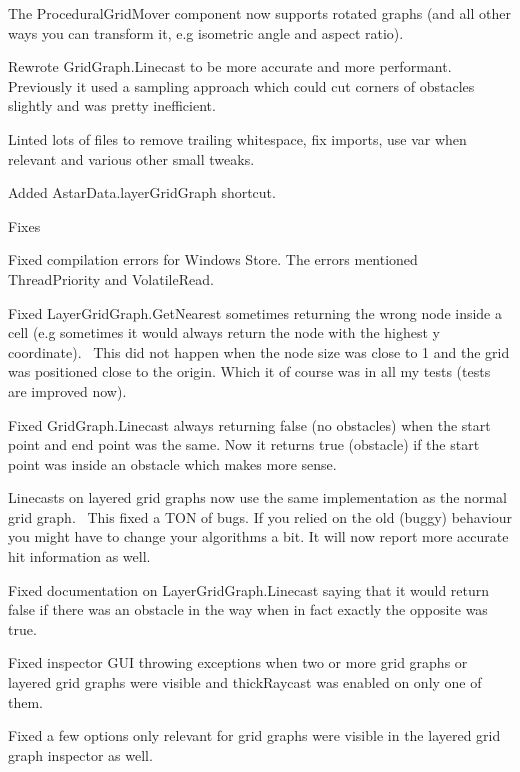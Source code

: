 \begin{DoxyItemize}
\begin{DoxyItemize}
\begin{DoxyItemize}
\item The Procedural\+Grid\+Mover component now supports rotated graphs (and all other ways you can transform it, e.\+g isometric angle and aspect ratio).
\item Rewrote Grid\+Graph.\+Linecast to be more accurate and more performant. Previously it used a sampling approach which could cut corners of obstacles slightly and was pretty inefficient.
\item Linted lots of files to remove trailing whitespace, fix imports, use \textquotesingle{}var\textquotesingle{} when relevant and various other small tweaks.
\item Added Astar\+Data.\+layer\+Grid\+Graph shortcut.
\end{DoxyItemize}
\item Fixes
\begin{DoxyItemize}
\item Fixed compilation errors for Windows Store. The errors mentioned Thread\+Priority and Volatile\+Read.
\item Fixed Layer\+Grid\+Graph.\+Get\+Nearest sometimes returning the wrong node inside a cell (e.\+g sometimes it would always return the node with the highest y coordinate).~\newline
 This did not happen when the node size was close to 1 and the grid was positioned close to the origin. Which it of course was in all my tests (tests are improved now).
\item Fixed Grid\+Graph.\+Linecast always returning false (no obstacles) when the start point and end point was the same. Now it returns true (obstacle) if the start point was inside an obstacle which makes more sense.
\item Linecasts on layered grid graphs now use the same implementation as the normal grid graph.~\newline
 This fixed a T\+ON of bugs. If you relied on the old (buggy) behaviour you might have to change your algorithms a bit. It will now report more accurate hit information as well.
\item Fixed documentation on Layer\+Grid\+Graph.\+Linecast saying that it would return false if there was an obstacle in the way when in fact exactly the opposite was true.
\item Fixed inspector G\+UI throwing exceptions when two or more grid graphs or layered grid graphs were visible and thick\+Raycast was enabled on only one of them.
\item Fixed a few options only relevant for grid graphs were visible in the layered grid graph inspector as well.

\end{DoxyItemize}
\end{DoxyItemize}
\end{DoxyItemize}
